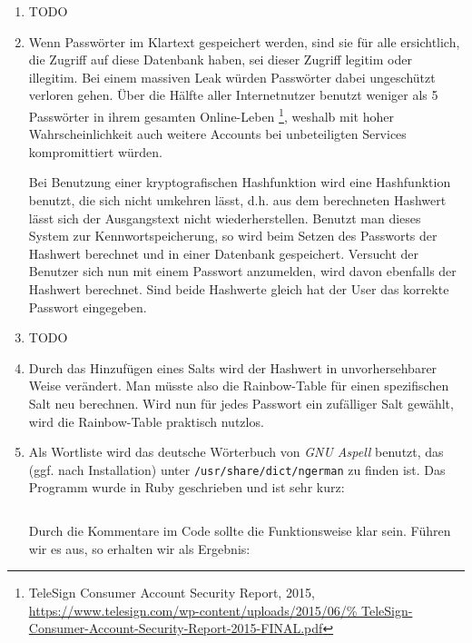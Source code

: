 \documentclass[a4paper,11pt]{scrartcl}
\begin{document}
\begin{enumerate}[1.]
    \item TODO
    \item
        Wenn Passwörter im Klartext gespeichert werden, sind sie für alle
        ersichtlich, die Zugriff auf diese Datenbank haben, sei dieser Zugriff
        legitim oder illegitim. Bei einem massiven Leak würden Passwörter
        dabei ungeschützt verloren gehen. Über die Hälfte aller Internetnutzer
        benutzt weniger als 5 Passwörter in ihrem gesamten Online-Leben%
        \footnote{TeleSign Consumer Account Security Report, 2015,\\%
        \url{https://www.telesign.com/wp-content/uploads/2015/06/%
        TeleSign-Consumer-Account-Security-Report-2015-FINAL.pdf}},
        weshalb mit hoher Wahrscheinlichkeit auch weitere Accounts bei unbeteiligten
        Services kompromittiert würden.

        Bei Benutzung einer kryptografischen Hashfunktion wird eine Hashfunktion
        benutzt, die sich nicht umkehren lässt, d.h. aus dem berechneten
        Hashwert lässt sich der Ausgangstext nicht wiederherstellen. Benutzt man
        dieses System zur Kennwortspeicherung, so wird beim Setzen des Passworts
        der Hashwert berechnet und in einer Datenbank gespeichert. Versucht der
        Benutzer sich nun mit einem Passwort anzumelden, wird davon ebenfalls
        der Hashwert berechnet. Sind beide Hashwerte gleich hat der User das
        korrekte Passwort eingegeben.

    \item TODO

    \item
        Durch das Hinzufügen eines Salts wird der Hashwert in unvorhersehbarer
        Weise verändert. Man müsste also die Rainbow-Table für einen spezifischen
        Salt neu berechnen. Wird nun für jedes Passwort ein zufälliger Salt
        gewählt, wird die Rainbow-Table praktisch nutzlos.

    \item
        Als Wortliste wird das deutsche Wörterbuch von \textit{GNU Aspell}
        benutzt, das (ggf. nach Installation) unter
        \texttt{/usr/share/dict/ngerman} zu finden ist. Das Programm wurde in
        Ruby geschrieben und ist sehr kurz:

        \inputminted[linenos,numbersep=12pt,autogobble,frame=lines,framesep=2mm]%
                    {ruby}{pwcrack.rb}

        Durch die Kommentare im Code sollte die Funktionsweise klar sein. Führen
        wir es aus, so erhalten wir als Ergebnis:


\end{enumerate}
\end{document}
